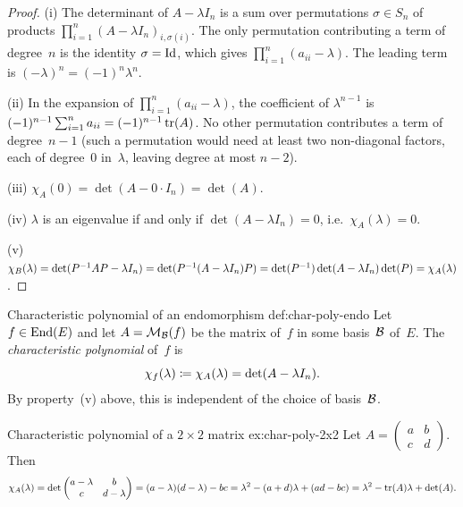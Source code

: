 \begin{proof}
(i) The determinant of $A - \lambda I_n$ is a sum over permutations
$\sigma\in S_n$ of products $\prod_{i=1}^n (A - \lambda I_n)_{i,\sigma(i)}$.
The only permutation contributing a term of degree~$n$ is the identity
$\sigma = \operatorname{Id}$, which gives $\prod_{i=1}^n (a_{ii} - \lambda)$.  The
leading term is $(-\lambda)^n = (-1)^n\lambda^n$.

(ii) In the expansion of $\prod_{i=1}^n(a_{ii} - \lambda)$, the coefficient
of $\lambda^{n-1}$ is $(-1)^{n-1}\sum_{i=1}^n a_{ii} = (-1)^{n-1}\operatorname{tr}(A)$.
No other permutation contributes a term of degree~$n-1$ (such a
permutation would need at least two non-diagonal factors, each of degree~$0$
in~$\lambda$, leaving degree at most $n-2$).

(iii) $\chi_A(0) = \det(A - 0\cdot I_n) = \det(A)$.

(iv) $\lambda$ is an eigenvalue if and only if $\det(A - \lambda I_n) = 0$,
i.e.\ $\chi_A(\lambda) = 0$.

(v) $\chi_B(\lambda) = \det({P}^{-1}AP - \lambda I_n)
= \det({P}^{-1}(A - \lambda I_n)P)
= \det({P}^{-1})\det(A-\lambda I_n)\det(P)
= \chi_A(\lambda)$.
\end{proof}

\begin{definition}{Characteristic polynomial of an endomorphism}%
{def:char-poly-endo}
Let $f\in\operatorname{End}(E)$ and let $A = \mathcal{M}_{\mathcal{B}}(f)$ be the matrix of~$f$ in
some basis~${\mathcal{B}}$ of~$E$.  The \emph{characteristic polynomial}
of~$f$ is
\[
  \chi_f(\lambda) \coloneqq \chi_A(\lambda) = \det(A - \lambda I_n).
\]
By property~(v) above, this is independent of the choice of
basis~${\mathcal{B}}$.
\end{definition}

\begin{example}{Characteristic polynomial of a $2\times 2$ matrix}%
{ex:char-poly-2x2}
Let $A = \begin{pmatrix} a & b \\ c & d \end{pmatrix}$.  Then
\[
  \chi_A(\lambda) = \det\begin{pmatrix} a-\lambda & b \\ c & d-\lambda
  \end{pmatrix}
  = (a-\lambda)(d-\lambda) - bc
  = \lambda^2 - (a+d)\lambda + (ad-bc)
  = \lambda^2 - \operatorname{tr}(A)\lambda + \det(A).
\]
\end{example}

